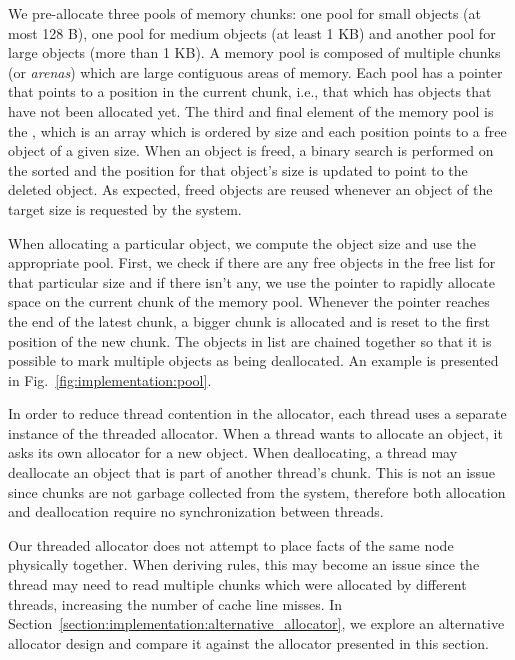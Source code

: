 We pre-allocate three pools of memory chunks: one pool for small objects (at
most 128 B), one pool for medium objects (at least 1 KB) and another pool for
large objects (more than 1 KB).  A memory pool is composed of multiple chunks
(or \emph{arenas}) which are large contiguous areas of memory. Each pool has a
 pointer that points to a position in the current chunk, i.e., that
which has objects that have not been allocated yet. The third and final element
of the memory pool is the , which is an array which is ordered
by size and each position points to a free object of a given size. When an
object is freed, a binary search is performed on the sorted and the position for
that object's size is updated to point to the deleted object. As expected, freed
objects are reused whenever an object of the target size is requested by the
system.

When allocating a particular object, we compute the object size and use the
appropriate pool. First, we check if there are any free objects in the free list
for that particular size and if there isn't any, we use the  pointer
to rapidly allocate space on the current chunk of the memory pool.  Whenever the
 pointer reaches the end of the latest chunk, a bigger chunk is
allocated and  is reset to the first position of the new chunk. The
objects in  list are chained together so that it is possible to mark
multiple objects as being deallocated.  An example is presented in
Fig.~\ref{fig:implementation:pool}.

In order to reduce thread contention in the allocator, each thread uses a
separate instance of the threaded allocator. When a thread wants to allocate an
object, it asks its own allocator for a new object. When deallocating, a thread
may deallocate an object that is part of another thread's chunk. This is not an
issue since chunks are not garbage collected from the system, therefore both
allocation and deallocation require no synchronization between threads.

Our threaded allocator does not attempt to place facts of the same node physically
together. When deriving rules, this may become an issue since the thread may
need to read multiple chunks which were allocated by different threads,
increasing the number of cache line misses. In
Section~\ref{section:implementation:alternative_allocator}, we explore an
alternative allocator design and compare it against the allocator presented in
this section.
